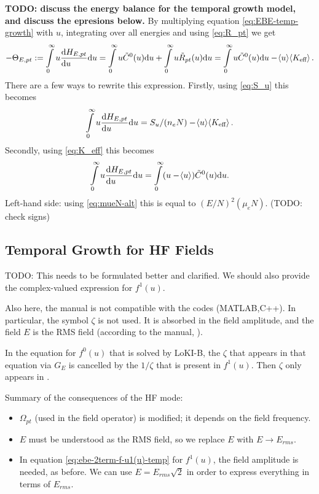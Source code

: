 \documentclass{book}
\newcommand{\MEAN}[1]{\ensuremath{\!\left\langle{{#1}}\right\rangle}}
\begin{document}
{\bf TODO: discuss the energy balance for the temporal growth model, and discuss the
epresions below.}
By multiplying equation \eqref{eq:EBE-temp-growth} with $u$, integrating over
all energies and using \eqref{eq:R_pt} we get
\begin{equation}
	-\Theta_{E,pt}
	:= \int\limits_0^\infty u\DERIV{H_{E,pt}}{u} \dd{u}
	= \int\limits_0^\infty u\tilde{C}^0(u) \dd{u}
	+ \int\limits_0^\infty u\tilde{R}_{pt}(u) \dd{u}
	= \int\limits_0^\infty u\tilde{C}^0(u) \dd{u}
	- \MEAN{u}\MEAN{K_{\text{eff}}}.
\end{equation}
There are a few ways to rewrite this expression. Firstly, using
\eqref{eq:S_u} this becomes
\begin{equation}
	\int\limits_0^\infty u\DERIV{H_{E,pt}}{u} \dd{u}
	= S_u/(n_eN)
	- \MEAN{u}\MEAN{K_{\text{eff}}}.
\end{equation}
Secondly, using
\eqref{eq:K_eff} this becomes
\begin{equation}
	\int\limits_0^\infty u\DERIV{H_{E,pt}}{u} \dd{u}
	= \int\limits_0^\infty (u-\MEAN{u})\tilde{C}^0(u) \dd{u}.
\end{equation}
Left-hand side: using \eqref{eq:mueN-alt} this is equal to
$(E/N)^2(\mu_eN)$. (TODO: check signs)


\subsection{Temporal Growth for HF Fields}

TODO: This needs to be formulated better and clarified. We should also
provide the complex-valued expression for $f^1(u)$.

Also here, the manual is not compatible with the codes (MATLAB,C++).
In particular, the symbol $\zeta$ is not used.
It is absorbed in the field amplitude, and the field $E$ is the RMS
field (according to the manual, \cite[above eq. 61]{Manual_2_2_0}).

In the equation for $f^0(u)$ that is solved by LoKI-B, the $\zeta$ that appears in
that equation via $G_{E}$ is cancelled by the $1/\zeta$ that is present in $f^1(u)$.
Then $\zeta$ only appears in .

Summary of the consequences of the HF mode:
\begin{itemize}
  \item $\Omega_{pt}$ (used in the field operator) is modified; it depends
	on the field frequency.
  \item $E$ must be understood as the RMS field, so we replace $E$ with $E\rightarrow E_{rms}$.
  \item In equation \eqref{eq:ebe-2term-f-u1(u)-temp} for $f^1(u)$, the
	field amplitude is needed, as before. We can use $E=E_{rms}\sqrt{2}$ in
	order to express everything in terms of $E_{rms}$.
\end{itemize}
\end{document}
